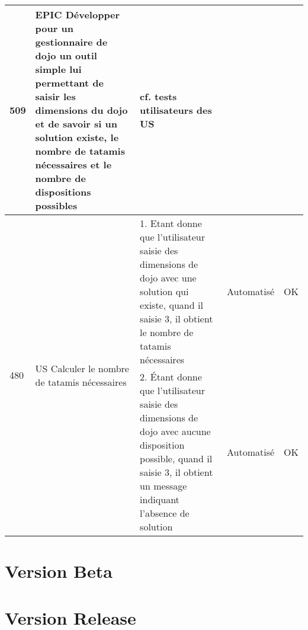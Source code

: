 \begin{adjustwidth}{-1.5cm}{0cm}
{\begin{tabular}{|m{0.6cm}|m{5.5cm}|m{8cm}|m{2cm}|c|}
            509                                                                                                      & EPIC Développer pour un gestionnaire de dojo un outil simple lui permettant de saisir les dimensions du dojo et
            de savoir si un solution existe, le nombre de tatamis nécessaires et le nombre de dispositions possibles & \cellcolor{tsyellow} cf. tests utilisateurs des US                                                                                     &                                                                                                                                                                                     &                            \\ \hline
            \multirow{2}{0.6cm}{480}                                                                                 & \multirow{2}{5.5cm}{US Calculer le nombre de tatamis nécessaires}                                                                      & 1. Etant donne que l'utilisateur saisie des dimensions de dojo avec une solution qui existe, quand il saisie 3, il obtient le nombre de tatamis nécessaires                         & Automatisé      & OK       \\ \cline{3-5}
                                                                                                                     &                                                                                                                                        & 2. Étant donne que l'utilisateur saisie des dimensions de dojo avec aucune disposition possible, quand il saisie 3, il obtient un message indiquant l'absence de solution           & Automatisé      & OK       \\ \hline
        \end{tabular}}
\end{adjustwidth}


\section{Version Beta}



\section{Version Release}